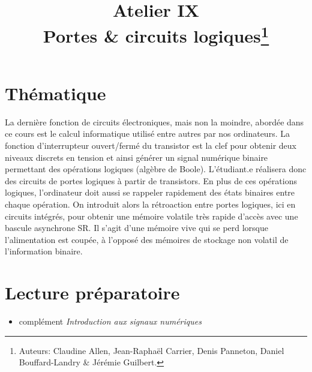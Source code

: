 \documentclass[canadien,12pt,oneside,letterpaper]{article}
\title{\textbf{Atelier IX}\\Portes \& circuits logiques\thanks{Auteurs: Claudine Allen, Jean-Raphaël Carrier, Denis Panneton, Daniel Bouffard-Landry \& Jérémie Guilbert.}}
\date{}
\begin{document}
\maketitle \vspace{-15ex}

\section{Thématique}\label{sec:objectifs}
\vspace{-2ex}
La dernière fonction de circuits électroniques, mais non la moindre, abordée dans ce cours est le calcul informatique utilisé entre autres par nos ordinateurs. La fonction d’interrupteur ouvert/fermé du transistor est la clef pour obtenir deux niveaux discrets en tension et ainsi générer un signal numérique binaire permettant des opérations logiques (algèbre de Boole). L’étudiant.e réalisera donc des circuits de portes logiques à partir de transistors. En plus de ces opérations logiques, l’ordinateur doit aussi se rappeler rapidement des états binaires entre chaque opération. On introduit alors la rétroaction entre portes logiques, ici en circuits intégrés, pour obtenir une mémoire volatile très rapide d’accès avec une bascule asynchrone SR. Il s’agit d’une mémoire vive qui se perd lorsque l’alimentation est coupée, à l’opposé des mémoires de stockage non volatil de l’information binaire. 

\section{Lecture préparatoire}
\vspace{-2ex}
\begin{itemize}
\item complément \textit{Introduction aux signaux numériques}
\end{itemize}


\end{document}
